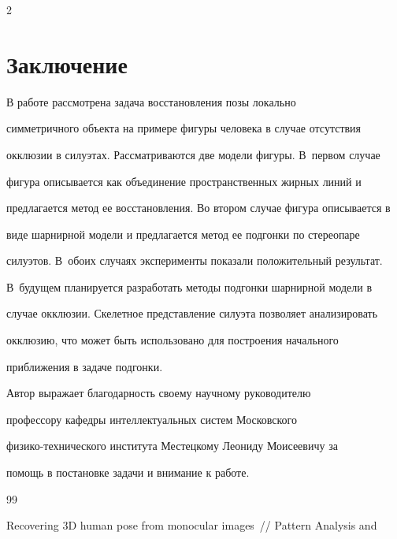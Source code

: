 \begin{multicols}{2}
      

\section{Заключение}



     В работе рассмотрена задача восстановления позы локально 

симметричного объекта на примере фигуры человека в случае отсутствия 

окклюзии в силуэтах. Рассматриваются две модели фигуры. В~первом случае 

фигура описывается как объединение пространственных жирных линий и 

предлагается метод ее восстановления. Во втором случае фигура описывается в 

виде шарнирной модели и предлагается метод ее подгонки по стереопаре 

силуэтов. В~обоих случаях эксперименты показали положительный результат. 

В~будущем планируется разработать методы подгонки шарнирной модели в 

случае окклюзии. Скелетное представление силуэта позволяет анализировать 

окклюзию, что может быть использовано для построения начального 

приближения в задаче подгонки.

     

     \bigskip

     Автор выражает благодарность своему научному руководителю 

профессору кафедры интеллектуальных систем Московского 

     физико-технического института Местецкому Леониду Моисеевичу за 

помощь в постановке задачи и внимание к работе.



{\small\frenchspacing

{%


\begin{thebibliography}{99}





Recovering 3D human pose from monocular images~// Pattern Analysis and 


\end{thebibliography}}}
\end{multicols}
